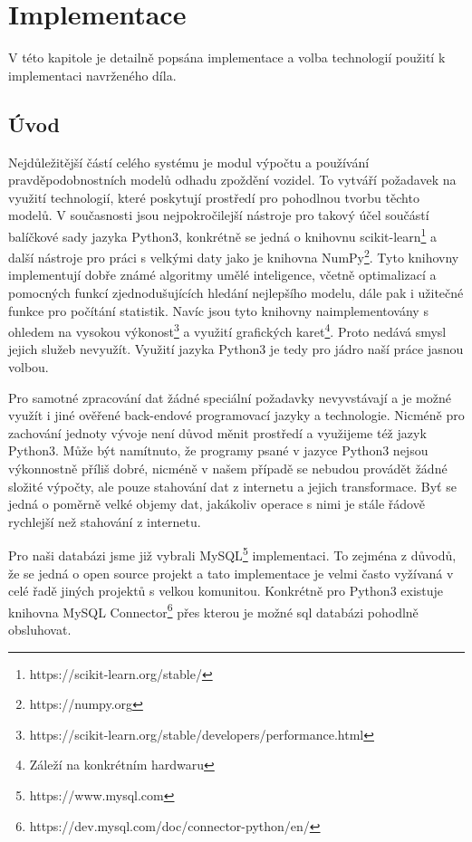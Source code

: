 

\chapter{Implementace} \label{chapter:implementace}


V této kapitole je detailně popsána implementace a volba technologií použití k implementaci navrženého díla.


\section{Úvod}


Nejdůležitější částí celého systému je modul výpočtu a používání pravděpodobnostních modelů odhadu zpoždění vozidel. To vytváří požadavek na využití technologií, které poskytují prostředí pro pohodlnou tvorbu těchto modelů. V současnosti jsou nejpokročilejší nástroje pro takový účel součástí balíčkové sady jazyka Python3, konkrétně se jedná o knihovnu scikit-learn\footnote{https://scikit-learn.org/stable/} a další nástroje pro práci s velkými daty jako je knihovna NumPy\footnote{https://numpy.org}. Tyto knihovny implementují dobře známé algoritmy umělé inteligence, včetně optimalizací a pomocných funkcí zjednodušujících hledání nejlepšího modelu, dále pak i užitečné funkce pro počítání statistik. Navíc jsou tyto knihovny naimplementovány s ohledem na vysokou výkonost\footnote{https://scikit-learn.org/stable/developers/performance.html} a využití grafických karet\footnote{Záleží na konkrétním hardwaru}. Proto nedává smysl jejich služeb nevyužít. Využití jazyka Python3 je tedy pro jádro naší práce jasnou volbou.


\bigbreak


Pro samotné zpracování dat žádné speciální požadavky nevyvstávají a je možné využít i jiné ověřené back-endové programovací jazyky a technologie. Nicméně pro zachování jednoty vývoje není důvod měnit prostředí a využijeme též jazyk Python3. Může být namítnuto, že programy psané v jazyce Python3 nejsou výkonnostně příliš dobré, nicméně v našem případě se nebudou provádět žádné složité výpočty, ale pouze stahování dat z internetu a jejich transformace. Byť se jedná o poměrně velké objemy dat, jakákoliv operace s nimi je stále řádově rychlejší než stahování z internetu.


\bigbreak


Pro naši databázi jsme již vybrali MySQL\footnote{https://www.mysql.com} implementaci. To zejména z důvodů, že se jedná o open source projekt a tato implementace je velmi často vyžívaná v celé řadě jiných projektů s velkou komunitou. Konkrétně pro Python3 existuje knihovna MySQL Connector\footnote{https://dev.mysql.com/doc/connector-python/en/} přes kterou je možné \gls{sql} databázi pohodlně obsluhovat.


